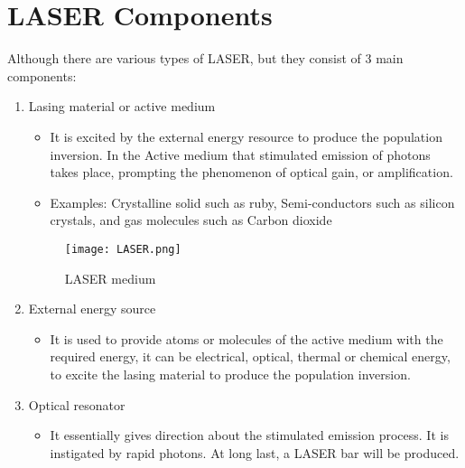 \documentclass[a4paper,12pt]{article}
\begin{document}
\section{LASER Components}
Although there are various types of LASER, but they consist of 3 main components:
\begin{enumerate}
    \item Lasing material or active medium
    \begin{itemize}
     \item It is excited by the external energy resource to produce the population inversion. In the Active medium that stimulated emission of photons takes place, prompting the phenomenon of optical gain, or amplification.
     \item Examples: Crystalline solid such as ruby, Semi-conductors such as silicon crystals, and gas molecules such as Carbon dioxide 
   \end{itemize}
   \begin{figure}[h!]
   \centering
   \texttt{[image: LASER.png]}
   \caption{LASER medium}
   \label{fig:emission}
   \end{figure}
   \item External energy source
   \begin{itemize}
       \item It is used to provide atoms or molecules of the active medium with the required energy, it can be electrical, optical, thermal or chemical energy, to excite the lasing material to produce the population inversion.
   \end{itemize}
   \item Optical resonator
   \begin{itemize}
       \item It essentially gives direction about the stimulated emission process. It is instigated by rapid photons. At long last, a LASER bar will be produced.
   \end{itemize}
\end{enumerate}
 
\end{document}
